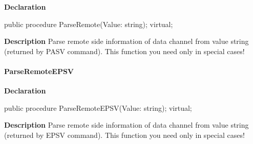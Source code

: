 \documentclass{report}
\newif\ifpdf
\begin{document}
\label{ftpsend.TFTPSend-ParseRemote}
\begin{list}{}{
\setlength{\itemindent}{0cm}
\setlength{\listparindent}{0cm}
\setlength{\leftmargin}{\evensidemargin}
\addtolength{\leftmargin}{\tmplength}
\settowidth{\labelsep}{X}
\addtolength{\leftmargin}{\labelsep}
\setlength{\labelwidth}{\tmplength}
}
\item[\textbf{Declaration}\hfill]
\ifpdf
\begin{flushleft}
\fi
\begin{ttfamily}
public procedure ParseRemote(Value: string); virtual;\end{ttfamily}

\ifpdf
\end{flushleft}
\fi

\par
\item[\textbf{Description}]
Parse remote side information of data channel from value string (returned by PASV command). This function you need only in special cases!

\end{list}
\paragraph*{ParseRemoteEPSV}\hspace*{\fill}

\label{ftpsend.TFTPSend-ParseRemoteEPSV}
\begin{list}{}{
\setlength{\itemindent}{0cm}
\setlength{\listparindent}{0cm}
\setlength{\leftmargin}{\evensidemargin}
\addtolength{\leftmargin}{\tmplength}
\settowidth{\labelsep}{X}
\addtolength{\leftmargin}{\labelsep}
\setlength{\labelwidth}{\tmplength}
}
\item[\textbf{Declaration}\hfill]
\ifpdf
\begin{flushleft}
\fi
\begin{ttfamily}
public procedure ParseRemoteEPSV(Value: string); virtual;\end{ttfamily}

\ifpdf
\end{flushleft}
\fi

\par
\item[\textbf{Description}]
Parse remote side information of data channel from value string (returned by EPSV command). This function you need only in special cases!

\end{list}
\end{document}
